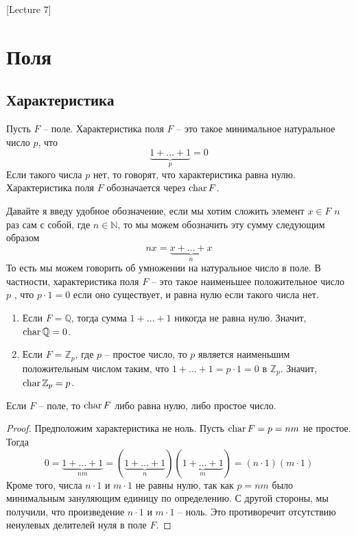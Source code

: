 [Lecture 7]


\section{Поля}

\subsection{Характеристика}

\begin{definition}
Пусть $F$ -- поле.
Характеристика поля $F$ -- это такое минимальное натуральное число $p$, что
\[
\underbrace{1+\ldots + 1}_p = 0
\]
Если такого числа $p$ нет, то говорят, что характеристика равна нулю.
Характеристика поля $F$ обозначается через $\operatorname{char} F$.
\end{definition}

Давайте я введу удобное обозначение, если мы хотим сложить элемент $x\in F$ $n$ раз сам с собой, где $n\in \mathbb N$, то мы можем обозначить эту сумму следующим образом
\[
n x = \underbrace{x+\ldots + x}_n
\]
То есть мы можем говорить об умножении на натуральное число в поле.
В частности, характеристика поля $F$ -- это такое наименьшее положительное число $p$ , что $p \cdot 1 = 0$ если оно существует, и равна нулю если такого числа нет.

\begin{examples}
\begin{enumerate}
\item Если $F = \mathbb Q$, тогда сумма $1+\ldots + 1$ никогда не равна нулю.
Значит, $\operatorname{char} \mathbb Q = 0$.

\item Если $F = \mathbb Z_p$, где $p$ -- простое число, то $p$ является наименьшим положительным числом таким, что $1 + \ldots + 1 = p \cdot 1 = 0$ в $\mathbb Z_p$.
Значит, $\operatorname{char} \mathbb Z_p = p$.
\end{enumerate}
\end{examples}

\begin{claim}
Если $F$ -- поле, то $\operatorname{char} F$ либо равна нулю, либо простое число.
\end{claim}
\begin{proof}
Предположим характеристика не ноль.
Пусть $\operatorname{char} F = p = n m$ не простое.
Тогда
\[
0 = \underbrace{1+\ldots + 1}_{nm} = (\underbrace{1+\ldots + 1}_{n})(\underbrace{1+\ldots + 1}_{m}) = (n \cdot 1) (m \cdot 1)
\]
Кроме того, числа $n\cdot 1$ и $m\cdot 1$ не равны нулю, так как $p = nm$ было минимальным зануляющим единицу по определению.
С другой стороны, мы получили, что произведение $n\cdot 1$ и $m \cdot 1$ -- ноль.
Это противоречит отсутствию ненулевых делителей нуля в поле $F$.
\end{proof}

